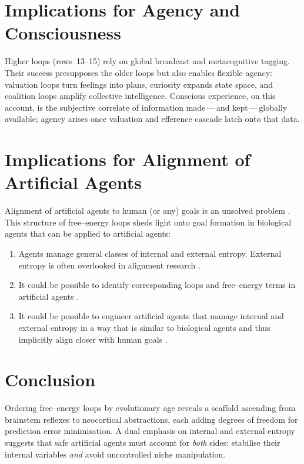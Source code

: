 \documentclass[10pt]{article}
\begin{document}
\section{Implications for Agency and Consciousness}
Higher loops (rows~13--15) rely on global broadcast and metacognitive tagging.  
Their success presupposes the older loops but also enables flexible agency: valuation loops turn feelings into plans, 
curiosity expands state space, and coalition loops amplify collective intelligence.  
Conscious experience, on this account, is the subjective correlate of information made\,---\,and kept\,---\,globally available; 
agency arises once valuation and efference cascade latch onto that data.  

\section{Implications for Alignment of Artificial Agents}
Alignment of artificial agents to human (or any) goals is an unsolved problem \cite{russell2019human, ngo2022alignment, miri2024problem}.
This structure of free--energy loops sheds light onto goal formation in biological agents that can be applied to artificial agents:
\begin{enumerate}
\item Agents manage general classes of internal and external entropy. External entropy is often overlooked in alignment research \cite{critch2020ai, hubinger2019risks}.
\item It could be possible to identify corresponding loops and free--energy terms in artificial agents \cite{friston2022designing, sajid2021active}.
\item It could be possible to engineer artificial agents that manage internal and external entropy in a way that is similar to biological agents and thus implicitly align closer with human goals \cite{millidge2020deep, ramstead2022bayesian}.
\end{enumerate}

\section{Conclusion}
Ordering free--energy loops by evolutionary age reveals a scaffold ascending from brainstem reflexes to neocortical abstractions, 
each adding degrees of freedom for prediction error minimisation.  
A dual emphasis on internal and external entropy suggests that safe artificial agents must account for \emph{both} sides: 
stabilise their internal variables \emph{and} avoid uncontrolled niche manipulation.  
\end{document}
